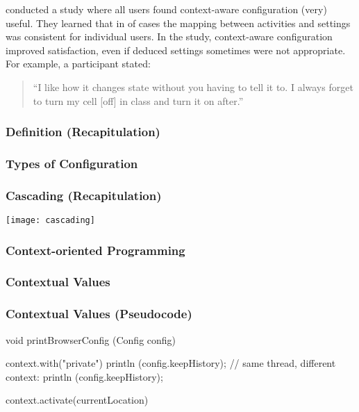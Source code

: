 \begin{frame}
	\citet{khalil2005context} conducted a study where all users found context-aware configuration (very) useful.
	They learned that in  of cases the mapping between activities and settings was consistent for individual users.
	In the study, context-aware configuration improved satisfaction, even if deduced settings sometimes were not appropriate.
	For example, a participant stated:
	\vspace{2em}

	\begin{quote}
	``I like how it changes state without you having to tell it to. I always forget to turn my cell [off] in class and turn it on after.''
	\end{quote}
\end{frame}

\begin{frame}
	\frametitle{Definition (Recapitulation)}
\end{frame}

\begin{frame}
	\frametitle{Types of Configuration}
	\begin{description}
	\end{description}
\end{frame}

\begin{frame}
	\frametitle{Cascading (Recapitulation)}
	\texttt{[image: cascading]}
\end{frame}

\begin{frame}
	\frametitle{Context-oriented Programming}
\end{frame}

\begin{frame}
	\frametitle{Contextual Values}
\end{frame}

\begin{frame}[fragile]
	\frametitle{Contextual Values (Pseudocode)}

	\begin{code}[gobble=4,language=C++,morekeywords={context}]
	void printBrowserConfig (Config config)
	{
		context.with("private")
		{
			println (config.keepHistory);
		}
		// same thread, different context:
		println (config.keepHistory);

		context.activate(currentLocation)
	}
	\end{code}
\end{frame}

